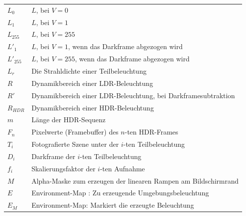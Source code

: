\begin{table}[H]
\begin{tabular}{ll}
   \hline
   $L_{0}$   & $L$, bei $V=0$\\
   $L_{1}$   & $L$, bei $V=1$\\
   $L_{255}$ & $L$, bei $V=255$\\
   $L'_{1}$   & $L$, bei $V=1$, wenn das Darkframe abgezogen wird\\
   $L'_{255}$ & $L$, bei $V=255$, wenn das Darkframe abgezogen wird\\
   $L_r$     & Die Strahldichte einer Teilbeleuchtung\\
   \hline
   $R$ & Dynamikbereich einer LDR-Beleuchtung \\
   $R'$ & Dynamikbereich einer LDR-Beleuchtung, bei Darkframesubtraktion \\
   $R_{HDR}$ & Dynamikbereich einer HDR-Beleuchtung \\
   \hline
   $m$   &  Länge der HDR-Sequenz\\
   $F_n$     & Pixelwerte (Framebuffer) des $n$-ten HDR-Frames\\
   $T_i$     & Fotografierte Szene unter der $i$-ten Teilbeleuchtung\\
   $D_i$     & Darkframe der $i$-ten Teilbeleuchtung\\
   $f_i$   &  Skalierungsfaktor der  $i$-ten Aufnahme\\
   \hline
   $M$ & Alpha-Maske zum erzeugen der linearen Rampen am Bildschirmrand \\
   $E$ & Environment-Map : Zu erzeugende Umgebungsbeleuchtung \\
   $E_M$ & Environment-Map: Markiert die erzeugte Beleuchtung \\

  \end{tabular}
 \end{table} 



